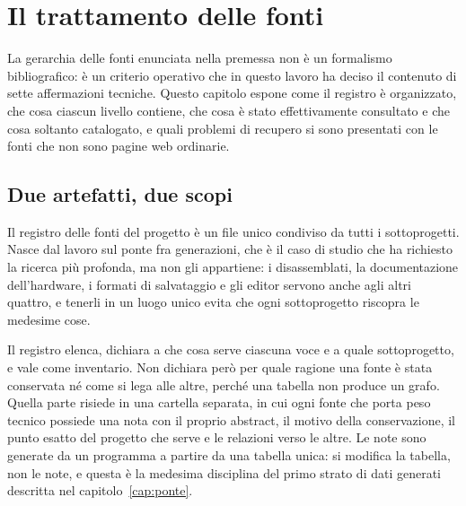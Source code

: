 
\chapter{Il trattamento delle fonti}
\label{cap:fonti}

La gerarchia delle fonti enunciata nella premessa non è un formalismo bibliografico: è un criterio operativo che in questo lavoro ha deciso il contenuto di sette affermazioni tecniche. Questo capitolo espone come il registro è organizzato, che cosa ciascun livello contiene, che cosa è stato effettivamente consultato e che cosa soltanto catalogato, e quali problemi di recupero si sono presentati con le fonti che non sono pagine web ordinarie.

\section{Due artefatti, due scopi}

Il registro delle fonti del progetto è un file unico condiviso da tutti i sottoprogetti. Nasce dal lavoro sul ponte fra generazioni, che è il caso di studio che ha richiesto la ricerca più profonda, ma non gli appartiene: i disassemblati, la documentazione dell'hardware, i formati di salvataggio e gli editor servono anche agli altri quattro, e tenerli in un luogo unico evita che ogni sottoprogetto riscopra le medesime cose.

Il registro elenca, dichiara a che cosa serve ciascuna voce e a quale sottoprogetto, e vale come inventario. Non dichiara però per quale ragione una fonte è stata conservata né come si lega alle altre, perché una tabella non produce un grafo. Quella parte risiede in una cartella separata, in cui ogni fonte che porta peso tecnico possiede una nota con il proprio abstract, il motivo della conservazione, il punto esatto del progetto che serve e le relazioni verso le altre. Le note sono generate da un programma a partire da una tabella unica: si modifica la tabella, non le note, e questa è la medesima disciplina del primo strato di dati generati descritta nel capitolo~\ref{cap:ponte}.

